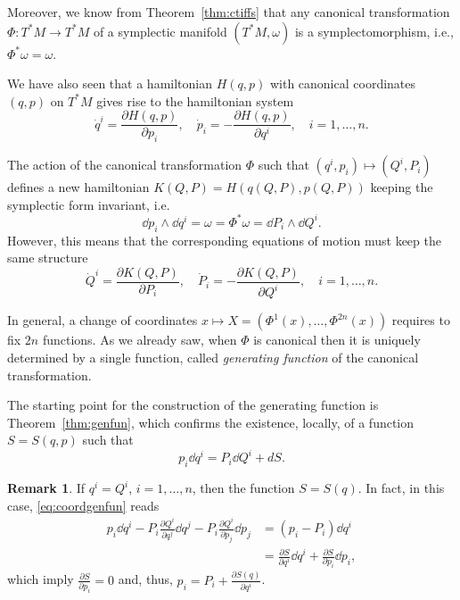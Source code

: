 \documentclass[english,fontsize=11pt,paper=b5]{scrbook}
\theoremstyle{definition}
\newtheorem{remark}{Remark}[chapter]
\begin{document}
    Moreover, we know from Theorem~\ref{thm:ctiffs} that any canonical transformation $\Phi:T^*M\to T^*M$ of a symplectic manifold $(T^*M,\omega)$ is a symplectomorphism, i.e., $\Phi^* \omega = \omega$.

    We have also seen that a hamiltonian $H(q,p)$ with canonical coordinates $(q,p)$ on $T^*M$ gives rise to the hamiltonian system
    \begin{equation}
      \dot q^i = \frac{\partial H(q,p)}{\partial p_i},\quad
      \dot p_i = -\frac{\partial H(q,p)}{\partial q^i},\quad
      i=1,\ldots,n.
    \end{equation}

    The action of the canonical transformation $\Phi$ such that $(q^i, p_i) \mapsto (Q^i, P_i)$ defines a new hamiltonian $K(Q,P) = H(q(Q,P), p(Q,P))$ keeping the symplectic form invariant, i.e.
    \begin{equation}
      \dd p_i \wedge \dd q^i = \omega = \Phi^* \omega = \dd P_i \wedge \dd Q^i.
    \end{equation}
    However, this means that the corresponding equations of motion must keep the same structure
    \begin{equation}
      \dot Q^i = \frac{\partial K(Q,P)}{\partial P_i},\quad
      \dot P_i = -\frac{\partial K(Q,P)}{\partial Q^i},\quad
      i=1,\ldots,n.
    \end{equation}

    In general, a change of coordinates $x\mapsto X=(\Phi^1(x), \ldots, \Phi^{2n}(x))$ requires to fix $2n$ functions.
    As we already saw, when $\Phi$ is canonical then it is uniquely determined by a single function, called \emph{generating function} of the canonical transformation.

    The starting point for the construction of the generating function is Theorem~\ref{thm:genfun}, which confirms the existence, locally, of a function $S=S(q,p)$ such that
    \begin{equation}\label{eq:coordgenfun}
      p_i \dd q^i = P_i \dd Q^i + dS.
    \end{equation}

    \begin{remark}
      If $q^i = Q^i$, $i=1,\ldots,n$, then the function $S=S(q)$. In fact, in this case, \eqref{eq:coordgenfun} reads
      \begin{align}
        p_i \dd q^i - P_i \frac{\partial Q^i}{\partial q^j}\dd q^j - P_i \frac{\partial Q^i}{\partial p_j}\dd p_j & = (p_i -P_i)\dd q^i                                                               \\
                                                                                                                  & = \frac{\partial S}{\partial q^i}\dd q^i + \frac{\partial S}{\partial p_i}\dd p_i,
      \end{align}
      which imply $\frac{\partial S}{\partial p_i} = 0$ and, thus, $p_i = P_i + \frac{\partial S(q)}{\partial q^i}$.
    \end{remark}
\end{document}
